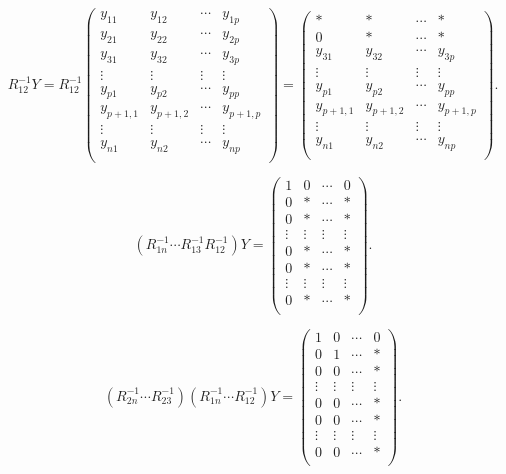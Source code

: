 \documentclass{article}
\begin{document}
\begin{equation}
R_{12}^{-1} Y 
=
R_{12}^{-1}
\begin{pmatrix}
y_{11} & y_{12} & \cdots & y_{1p}\\
y_{21} & y_{22} & \cdots & y_{2p}\\
y_{31} & y_{32} & \cdots & y_{3p}\\
\vdots & \vdots & \vdots & \vdots\\
y_{p1} & y_{p2} & \cdots & y_{pp}\\
y_{p+1,1} & y_{p+1,2} & \cdots & y_{p+1,p}\\
\vdots & \vdots & \vdots & \vdots\\
y_{n1} & y_{n2} & \cdots & y_{np}\\
\end{pmatrix}
=
\begin{pmatrix}
* & * & \cdots & *\\
0 & * & \cdots & *\\
y_{31} & y_{32} & \cdots & y_{3p}\\
\vdots & \vdots & \vdots & \vdots\\
y_{p1} & y_{p2} & \cdots & y_{pp}\\
y_{p+1,1} & y_{p+1,2} & \cdots & y_{p+1,p}\\
\vdots & \vdots & \vdots & \vdots\\
y_{n1} & y_{n2} & \cdots & y_{np}\\
\end{pmatrix}.
\end{equation}

\begin{equation}
(R_{1n}^{-1} \cdots R_{13}^{-1} R_{12}^{-1}) Y 
=
\begin{pmatrix}
1 & 0 & \cdots & 0\\
0 & * & \cdots & *\\
0 & * & \cdots & *\\
\vdots & \vdots & \vdots & \vdots\\
0 & * & \cdots & *\\
0 & * & \cdots & *\\
\vdots & \vdots & \vdots & \vdots\\
0 & * & \cdots & *\\
\end{pmatrix}.
\end{equation}

\begin{equation}
(R_{2n}^{-1} \cdots R_{23}^{-1})
(R_{1n}^{-1} \cdots R_{12}^{-1}) Y 
=
\begin{pmatrix}
1 & 0 & \cdots & 0\\
0 & 1 & \cdots & *\\
0 & 0 & \cdots & *\\
\vdots & \vdots & \vdots & \vdots\\
0 & 0 & \cdots & *\\
0 & 0 & \cdots & *\\
\vdots & \vdots & \vdots & \vdots\\
0 & 0 & \cdots & *\\
\end{pmatrix}.
\end{equation}
\end{document}
